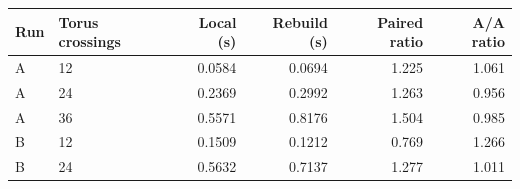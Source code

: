 \begin{tabular}{llrrrr}
\toprule
Run & Torus crossings & Local (s) & Rebuild (s) & Paired ratio & A/A ratio\\
\midrule
A & 12 & 0.0584 & 0.0694 & 1.225 & 1.061\\
A & 24 & 0.2369 & 0.2992 & 1.263 & 0.956\\
A & 36 & 0.5571 & 0.8176 & 1.504 & 0.985\\
B & 12 & 0.1509 & 0.1212 & 0.769 & 1.266\\
B & 24 & 0.5632 & 0.7137 & 1.277 & 1.011\\
\bottomrule
\end{tabular}
